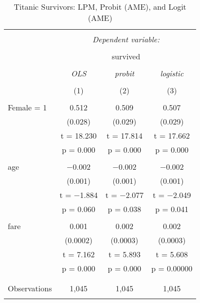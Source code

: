 \documentclass[
  12pt,
]{article}
\begin{document}
\begin{table}[t] \centering 
  \caption{Titanic Survivors: LPM, Probit (AME), and Logit (AME)} 
  \label{titanic} 
\begin{tabular}{@{\extracolsep{5pt}}lccc} 
\\[-1.8ex]\hline 
\hline \\[-1.8ex] 
 & \multicolumn{3}{c}{\textit{Dependent variable:}} \\ 
\cline{2-4} 
\\[-1.8ex] & \multicolumn{3}{c}{survived} \\ 
\\[-1.8ex] & \textit{OLS} & \textit{probit} & \textit{logistic} \\ 
\\[-1.8ex] & (1) & (2) & (3)\\ 
\hline \\[-1.8ex] 
 Female = 1 & 0.512 & 0.509 & 0.507 \\ 
  & (0.028) & (0.029) & (0.029) \\ 
  & t = 18.230 & t = 17.814 & t = 17.662 \\ 
  & p = 0.000 & p = 0.000 & p = 0.000 \\ 
  & & & \\ 
 age & $-$0.002 & $-$0.002 & $-$0.002 \\ 
  & (0.001) & (0.001) & (0.001) \\ 
  & t = $-$1.884 & t = $-$2.077 & t = $-$2.049 \\ 
  & p = 0.060 & p = 0.038 & p = 0.041 \\ 
  & & & \\ 
 fare & 0.001 & 0.002 & 0.002 \\ 
  & (0.0002) & (0.0003) & (0.0003) \\ 
  & t = 7.162 & t = 5.893 & t = 5.608 \\ 
  & p = 0.000 & p = 0.000 & p = 0.00000 \\ 
  & & & \\ 
\hline \\[-1.8ex] 
Observations & 1,045 & 1,045 & 1,045 \\ 
\hline 
\hline \\[-1.8ex] 
\end{tabular} 
\end{table}
\end{document}
